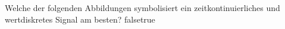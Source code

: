     {Welche der folgenden Abbildungen symbolisiert ein zeitkontinuierliches und wertdiskretes Signal am besten?}
    {}
    {}
    {}
    {}
    {false}{true}